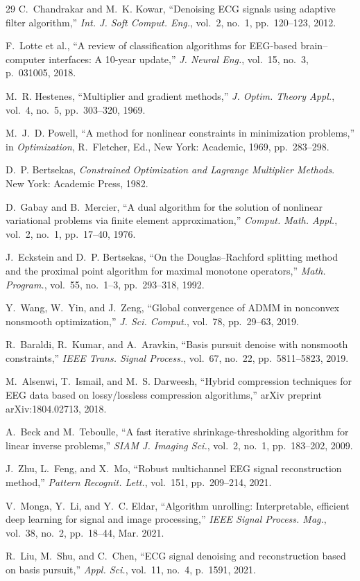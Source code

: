 \documentclass[journal,twoside,10pt]{IEEEtran}
\begin{document}
\begin{thebibliography}{29}
C.~Chandrakar and M.~K. Kowar,
``Denoising ECG signals using adaptive filter algorithm,''
\emph{Int. J. Soft Comput. Eng.}, vol.~2, no.~1, pp.~120--123, 2012.

F.~Lotte et al.,
``A review of classification algorithms for EEG-based brain--computer interfaces: A 10-year update,''
\emph{J. Neural Eng.}, vol.~15, no.~3, p.~031005, 2018.

M.~R. Hestenes,
``Multiplier and gradient methods,''
\emph{J. Optim. Theory Appl.}, vol.~4, no.~5, pp.~303--320, 1969.

M.~J.~D. Powell,
``A method for nonlinear constraints in minimization problems,''
in \emph{Optimization}, R.~Fletcher, Ed., New York: Academic, 1969, pp.~283--298.

D.~P. Bertsekas,
\emph{Constrained Optimization and Lagrange Multiplier Methods}.
New York: Academic Press, 1982.

D.~Gabay and B.~Mercier,
``A dual algorithm for the solution of nonlinear variational problems via finite element approximation,''
\emph{Comput. Math. Appl.}, vol.~2, no.~1, pp.~17--40, 1976.

J.~Eckstein and D.~P. Bertsekas,
``On the Douglas--Rachford splitting method and the proximal point algorithm for maximal monotone
operators,''
\emph{Math. Program.}, vol.~55, no.~1--3, pp.~293--318, 1992.

Y.~Wang, W.~Yin, and J.~Zeng,
``Global convergence of ADMM in nonconvex nonsmooth optimization,''
\emph{J. Sci. Comput.}, vol.~78, pp.~29--63, 2019.

R.~Baraldi, R.~Kumar, and A.~Aravkin,
``Basis pursuit denoise with nonsmooth constraints,''
\emph{IEEE Trans. Signal Process.}, vol.~67, no.~22, pp.~5811--5823, 2019.

M.~Alsenwi, T.~Ismail, and M.~S. Darweesh,
``Hybrid compression techniques for EEG data based on lossy/lossless compression algorithms,''
arXiv preprint arXiv:1804.02713, 2018.

A.~Beck and M.~Teboulle,
``A fast iterative shrinkage-thresholding algorithm for linear inverse problems,''
\emph{SIAM J. Imaging Sci.}, vol.~2, no.~1, pp.~183--202, 2009.

J.~Zhu, L.~Feng, and X.~Mo,
``Robust multichannel EEG signal reconstruction method,''
\emph{Pattern Recognit. Lett.}, vol.~151, pp.~209--214, 2021.

V.~Monga, Y.~Li, and Y.~C. Eldar,
``Algorithm unrolling: Interpretable, efficient deep learning for signal and image processing,''
\emph{IEEE Signal Process. Mag.}, vol.~38, no.~2, pp.~18--44, Mar. 2021.

R.~Liu, M.~Shu, and C.~Chen,
``ECG signal denoising and reconstruction based on basis pursuit,''
\emph{Appl. Sci.}, vol.~11, no.~4, p.~1591, 2021.

\end{thebibliography}

\end{document}
